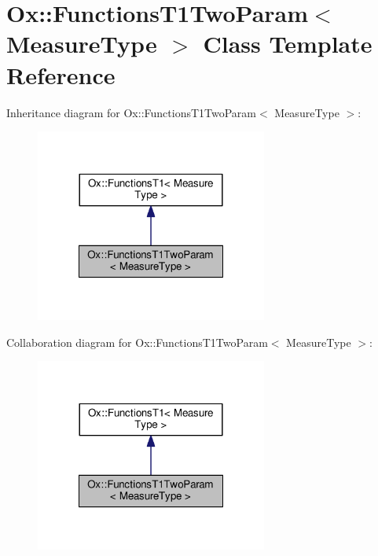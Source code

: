 \hypertarget{class_ox_1_1_functions_t1_two_param}{\section{Ox\-:\-:Functions\-T1\-Two\-Param$<$ Measure\-Type $>$ Class Template Reference}
\label{class_ox_1_1_functions_t1_two_param}
}


Inheritance diagram for Ox\-:\-:Functions\-T1\-Two\-Param$<$ Measure\-Type $>$\-:
\nopagebreak
\begin{figure}[H]
\begin{center}
\leavevmode
\includegraphics[width=216pt]{class_ox_1_1_functions_t1_two_param__inherit__graph}
\end{center}
\end{figure}


Collaboration diagram for Ox\-:\-:Functions\-T1\-Two\-Param$<$ Measure\-Type $>$\-:
\nopagebreak
\begin{figure}[H]
\begin{center}
\leavevmode
\includegraphics[width=216pt]{class_ox_1_1_functions_t1_two_param__coll__graph}
\end{center}
\end{figure}
